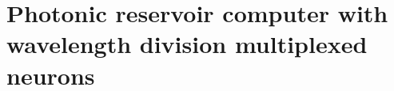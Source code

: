 \section[Photonic RC with frequency multiplexed neurons]{Photonic reservoir computer with wavelength division multiplexed neurons}
	
